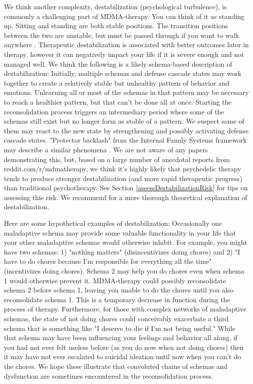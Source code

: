\documentclass[12pt,letterpaper]{book}
\begin{document}
\label{def:destabilization}
We think another complexity, destabilization (psychological turbulence), is commonly a challenging part of MDMA-therapy. You can think of it as standing up. Sitting and standing are both stable positions. The transition positions between the two are unstable, but must be passed through if you want to walk anywhere \cite{olthofDestabilization}. Therapeutic destabilization is associated with better outcomes later in therapy, however it can negatively impact your life if it is severe enough and not managed well. We think the following is a likely schema-based description of destabilization: Initially, multiple schemas and defense cascade states may work together to create a relatively stable but unhealthy pattern of behavior and emotions. Unlearning all or most of the schemas in that pattern may be necessary to reach a healthier pattern, but that can't be done all at once. Starting the reconsolidation process triggers an intermediary period where some of the schemas still exist but no longer form as stable of a pattern. We suspect some of them may react to the new state by strengthening and possibly activating defense cascade states. "Protector backlash" from the Internal Family Systems framework may describe a similar phenomena \cite{schwartz2019internal}. We are not aware of any papers demonstrating this, but, based on a large number of anecdotal reports from reddit.com/r/mdmatherapy, we think it's highly likely that psychedelic therapy tends to produce stronger destabilization (and more rapid therapeutic progress) than traditional psychotherapy. See Section \ref{assessDestabilizationRisk} for tips on assessing this risk. We recommend \textcite{hayes2020complex} for a more thorough theoretical explanation of destabilization.

Here are some hypothetical examples of destabilization: Occasionally one maladaptive schema may provide some valuable functionality in your life that your other maladaptive schemas would otherwise inhibit. For example, you might have two schemas: 1) "nothing matters" (disincentivizes doing chores) and 2) "I have to do chores because I'm responsible for everything all the time" (incentivizes doing chores). Schema 2 may help you do chores even when schema 1 would otherwise prevent it. MDMA-therapy could possibly reconsolidate schema 2 before schema 1, leaving you unable to do the chores until you also reconsolidate schema 1. This is a temporary decrease in function during the process of therapy. Furthermore, for those with complex networks of maladaptive schemas, the state of not doing chores could conceivably exacerbate a third schema that is something like "I deserve to die if I'm not being useful." While that schema may have been influencing your feelings and behavior all along, if you had not ever felt useless before (as you do now when not doing chores) then it may have not ever escalated to suicidal ideation until now when you can't do the chores. We hope these illustrate that convoluted chains of schemas and dysfunction are sometimes encountered in the reconsolidation process.
\end{document}
